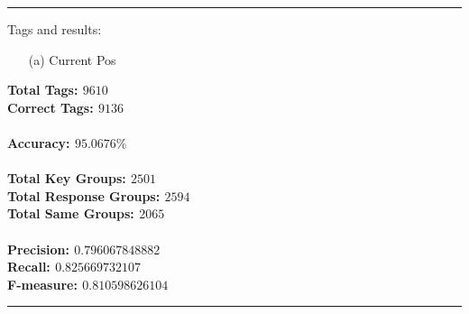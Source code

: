 \documentclass[ruled]{article}
\begin{document}
\noindent\rule{15cm}{0.4pt}
Tags and results:
\begin{itemize}
\item[(a)] Current Pos
\end{itemize}
\large{
\textbf{Total Tags: $9610$} \\
\textbf{Correct Tags: $9136$} \\
\\
\textbf{Accuracy: $95.0676\%$} \\
\\
\textbf{Total Key Groups: $2501$} \\
\textbf{Total Response Groups: $2594$} \\
\textbf{Total Same Groups: $2065$} \\
\\
\textbf{Precision: $0.796067848882$} \\
\textbf{Recall: $0.825669732107$} \\
\textbf{F-measure: $0.810598626104$} \\
}

\noindent\rule{15cm}{0.4pt}
\end{document}
